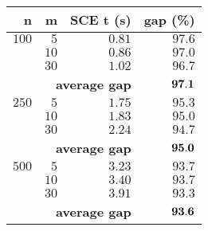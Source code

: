 \begin{tabular}{|r|r|rr|} \hline
\textbf{n}   & \textbf{m}  & \textbf{SCE t (s)} & \textbf{gap (\%)} \\ \hline
   $100$ & $5$  & $0.81$ & $97.6$ \\
	   & $10$ & $0.86$ & $97.0$ \\
	   & $30$ & $1.02$ & $96.7$ \\ \cline{2-4}
    & \multicolumn{2}{r}{{\bf average gap}}  & $\bf 97.1$  \\ \hline
   $250$ & $5$  & $1.75$ & $95.3$ \\
	   & $10$ & $1.83$ & $95.0$ \\
	   & $30$ & $2.24$ & $94.7$ \\ \cline{2-4}
    & \multicolumn{2}{r}{{\bf average gap}}  & $\bf 95.0$  \\ \hline
   $500$ & $5$  & $3.23$ & $93.7$ \\
	   & $10$ & $3.40$ & $93.7$ \\
	   & $30$ & $3.91$ & $93.3$ \\ \cline{2-4}
    & \multicolumn{2}{r}{{\bf average gap}}  & $\bf 93.6$  \\ \hline
\end{tabular}
